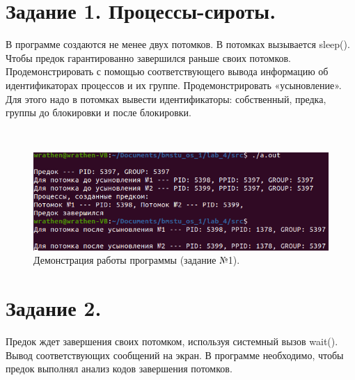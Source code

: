 \documentclass[12pt]{report}
\begin{document}
    
    
    \section*{Задание 1. Процессы-сироты.}
    В программе создаются не менее двух потомков.
    В потомках вызывается sleep().
    Чтобы предок гарантированно завершился раньше своих потомков.
    Продемонстрировать с помощью соответствующего вывода информацию об идентификаторах процессов и их группе.
    Продемонстрировать «усыновление».
    Для этого надо в потомках вывести идентификаторы:
    собственный, предка, группы до блокировки и после блокировки.
    
    \begin{lstlisting}[label=code:fork, caption=Процессы-сироты, language=C]
    	
    \end{lstlisting}

	\begin{figure}[H]
		
		\centering
		
		\includegraphics[width=\linewidth]{img/task_01.png}
		\caption{Демонстрация работы программы (задание №1).}
		
		\label{fig:task_01}
		
	\end{figure}

	\section*{Задание 2.}
	Предок ждет завершения своих потомком, используя системный вызов wait().
	Вывод соответствующих сообщений на экран.
	В программе необходимо, чтобы предок выполнял анализ кодов завершения потомков.
	
	\begin{lstlisting}[label=code:wait, caption=wait(), language=C]
		
	\end{lstlisting}
\end{document}
